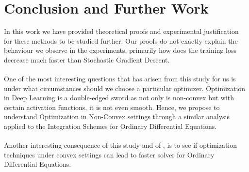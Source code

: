 
\section{Conclusion and Further Work}
In this work we have provided theoretical proofs and experimental justification for these methods to be studied further. Our proofs do not exactly explain the behaviour we observe in the experiments, primarily how does the training loss decrease much faster than Stochastic Gradient Descent.
\\
\\
One of the most interesting questions that has arisen from this study for us is under what circumstances should we choose a particular optimizer. Optimization in Deep Learning is a double-edged sword as not only is non-convex but with certain activation functions, it is not even smooth. Hence, we propose to understand Optimization in Non-Convex settings through a similar analysis applied to the Integration Schemes for Ordinary Differential Equations.
\\
\\
Another interesting consequence of this study and of \cite{alex2017}, is to see if optimization techniques under convex settings can lead to faster solver for Ordinary Differential Equations.
